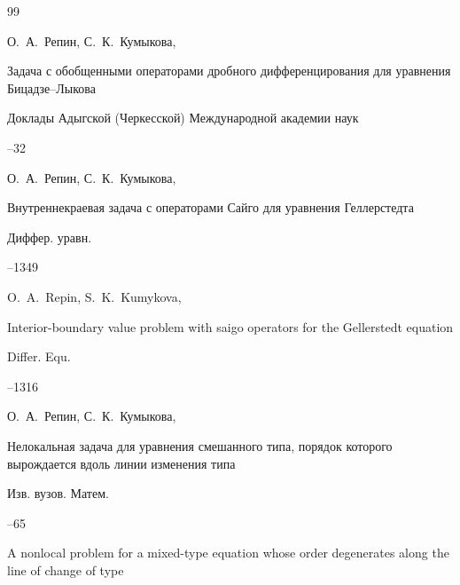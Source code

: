 \begin{thebibliography}{99}




\by О.~А.~Репин, С.~К.~Кумыкова,

\paper Задача с обобщенными операторами дробного дифференцирования для уравнения Бицадзе--Лыкова 

\jour Доклады Адыгской (Черкесской) Международной академии наук




--32




\by О.~А.~Репин, С.~К.~Кумыкова,

\paper Внутреннекраевая задача с операторами Сайго для уравнения Геллерстедта 

\jour Диффер. уравн.




--1349

\transl

\by O.~A.~Repin, S.~K.~Kumykova,

\paper Interior-boundary value problem with saigo operators for the Gellerstedt equation

\jour Differ. Equ. 



--1316 








\by О.~А.~Репин, С.~К.~Кумыкова,

\paper Нелокальная задача для уравнения смешанного типа, порядок которого вырождается вдоль линии изменения типа

\jour Изв. вузов. Матем.



--65


\transl

\paper A nonlocal problem for a mixed-type equation whose order degenerates along the line of change of type


\end{thebibliography}
